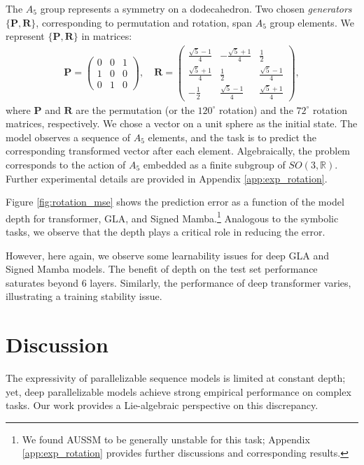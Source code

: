 \documentclass{article}
\theoremstyle{plain}
\theoremstyle{definition}
\theoremstyle{remark}
\newcommand{\mbf}[1]{\mathbf{#1}}
\newcommand{\bb}[1]{\mathbb{#1}}
\begin{document}
The $A_5$ group represents a symmetry on a dodecahedron.
Two chosen \emph{generators} $\{\mbf{P}, \mbf{R}\}$,
corresponding to permutation and rotation,
span $A_5$ group elements.
We represent $\{\mbf{P}, \mbf{R}\}$ in matrices:
\begin{align*}
    \mbf{P} = \begin{pmatrix}
        0 & 0 & 1 \\
        1 & 0 & 0 \\
        0 & 1 & 0
    \end{pmatrix},
    \quad
    \mbf{R} = \begin{pmatrix}
        \frac{\sqrt{5}-1}{4} & -\frac{\sqrt{5}+1}{4} & \frac{1}{2} \\
        \frac{\sqrt{5}+1}{4} & \frac{1}{2} & \frac{\sqrt{5}-1}{4} \\
        -\frac{1}{2} & \frac{\sqrt{5}-1}{4} & \frac{\sqrt{5}+1}{4}
    \end{pmatrix},
\end{align*}
where $\mbf{P}$ and $\mbf{R}$ are the permutation (or the $120^\circ$ rotation) and the $72^\circ$ rotation matrices, respectively.
We chose a vector on a unit sphere as the initial state.
The model observes a sequence of $A_5$ elements, and the task is to predict the corresponding transformed vector after each element.
Algebraically, the problem corresponds to the action of $A_5$ embedded as a finite subgroup of $SO(3,\bb{R})$. Further experimental details are provided in Appendix \ref{app:exp_rotation}.

Figure \ref{fig:rotation_mse} shows the prediction error as a function of the model depth for transformer, GLA, and Signed Mamba.\footnote{We found AUSSM to be generally unstable for this task; Appendix \ref{app:exp_rotation} provides further discussions and corresponding results.}
Analogous to the symbolic tasks, we observe that the depth plays a critical role in reducing the error.

However, here again, we observe some learnability issues for deep GLA and Signed Mamba models.
The benefit of depth on the test set performance saturates beyond 6 layers.
Similarly, the performance of deep transformer varies, illustrating a training stability issue.

\section{Discussion}
\label{sec:discussion}
The expressivity of parallelizable sequence models is limited at constant depth;
yet, deep parallelizable models achieve strong empirical performance on complex tasks.
Our work provides a Lie-algebraic perspective on this discrepancy.
\end{document}
